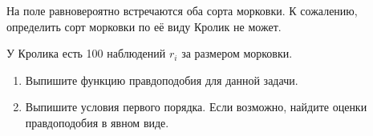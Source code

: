 \documentclass[12pt]{article} %
\theoremstyle{definition} %
\begin{document}
\begin{enumerate}
На поле равновероятно встречаются оба сорта морковки. К сожалению, определить сорт морковки по её виду Кролик не может. 

У Кролика есть 100 наблюдений $r_i$ за размером морковки. 

\begin{enumerate}
    \item Выпишите функцию правдоподобия для данной задачи. 
    \item Выпишите условия первого порядка. Если возможно, найдите оценки правдоподобия в явном виде. 
\end{enumerate}





\end{enumerate}
\end{document}
